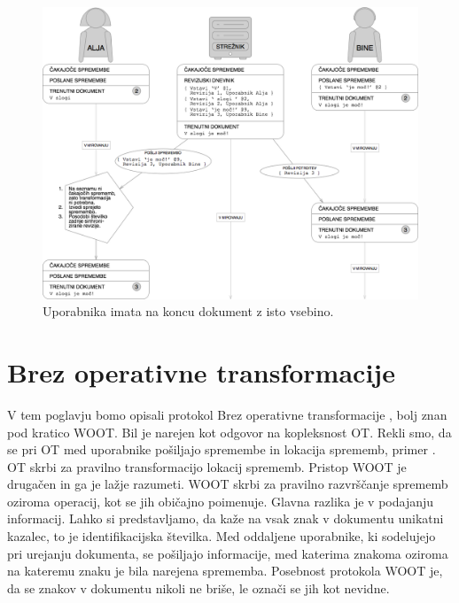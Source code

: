 \documentclass[a4paper, 12pt, twoside]{book}
\begin{document}
\begin{figure}[placement h]
\begin{center}
\includegraphics[width=14cm]{pc6.png}
\end{center}
\caption{Uporabnika imata na koncu dokument z isto vsebino.}
\label{pc6}
\end{figure}

\pagebreak

\section{Brez operativne transformacije}
\label{sec:woot}

V tem poglavju bomo opisali protokol Brez operativne transformacije \cite{woot}, bolj znan pod kratico WOOT. Bil je narejen kot odgovor na kopleksnost OT. Rekli smo, da se \linebreak pri OT med uporabnike pošiljajo spremembe in lokacija sprememb, primer . OT skrbi za pravilno transformacijo lokacij sprememb. Pristop WOOT je drugačen in ga je lažje razumeti. WOOT skrbi za pravilno razvrščanje sprememb oziroma operacij, kot se jih običajno poimenuje. Glavna razlika je v podajanju informacij. Lahko si predstavljamo, da kaže na vsak znak v dokumentu unikatni kazalec, to je identifikacijska številka. Med oddaljene uporabnike, ki sodelujejo pri urejanju dokumenta, se pošiljajo informacije, med katerima znakoma oziroma na kateremu znaku je bila narejena sprememba. Posebnost protokola WOOT je, da se znakov v dokumentu nikoli ne briše, le označi se jih kot nevidne.
\end{document}

